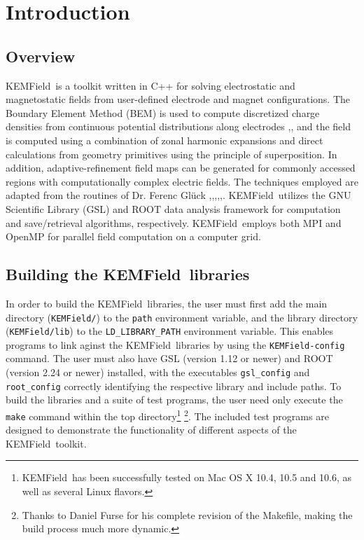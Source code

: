 \documentclass[11pt,a4paper,oneside]{article}
\newcommand{\kemfield}    {{\sc KEMField}}
\begin{document}
\tableofcontents
\newpage

\section{Introduction}
\label{sec:intro}

\subsection{Overview}
\label{subsec:overview}

\kemfield\ is a toolkit written in C++ for solving electrostatic and magnetostatic fields from user-defined electrode and magnet configurations.  The Boundary Element Method (BEM) is used to compute discretized charge densities from continuous potential distributions along electrodes \cite{Glueck3},\cite{Poljak}, and the field is computed using a combination of zonal harmonic expansions and direct calculations from geometry primitives using the principle of superposition.  In addition, adaptive-refinement field maps can be generated for commonly accessed regions with computationally complex electric fields.  The techniques employed are adapted from the routines of Dr. Ferenc Gl\"{u}ck \cite{Glueck},\cite{Glueck1},\cite{Glueck2},\cite{Glueck3},\cite{Glueck4},\cite{Glueck5}.  \kemfield\ utilizes the GNU Scientific Library (GSL) \cite{GSL} and ROOT data analysis framework \cite{ROOT} for computation and save/retrieval algorithms, respectively.  \kemfield\ employs both MPI \cite{MPI} and OpenMP \cite{OpenMP} for parallel field computation on a computer grid.  

\subsection{Building the \kemfield\ libraries}
\label{subsec:building}

In order to build the \kemfield\ libraries, the user must first add the main directory (\texttt{KEMField/}) to the \texttt{path} environment variable, and the library directory (\texttt{KEMField/lib}) to the \texttt{LD\_LIBRARY\_PATH} environment variable.  This enables programs to link aginst the \kemfield\ libraries by using the \texttt{KEMField-config} command.  The user must also have GSL (version 1.12 or newer) and ROOT (version 2.24 or newer) installed, with the executables \texttt{gsl\_config} and \texttt{root\_config} correctly identifying the respective library and include paths.  To build the libraries and a suite of test programs, the user need only execute the \texttt{make} command within the top directory\footnote{\kemfield\ has been successfully tested on Mac OS X 10.4, 10.5 and 10.6, as well as several Linux flavors.} \footnote{Thanks to Daniel Furse for his complete revision of the Makefile, making the build process much more dynamic.}.  The included test programs are designed to demonstrate the functionality of different aspects of the \kemfield\ toolkit.  
\end{document}
